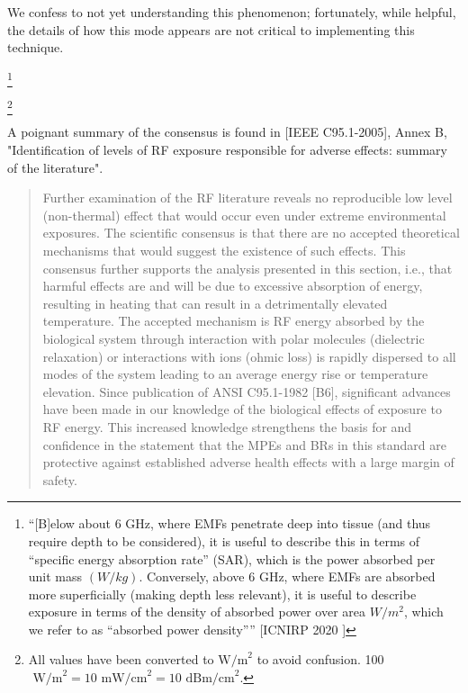\documentclass[fleqn,10pt]{article}
\begin{document}
\begin{multicols}{1}
{We confess to not yet understanding this phenomenon; fortunately, while helpful, the details of how this mode appears are not critical to implementing this technique.}

\footnote{``{[B]elow about 6 GHz, where EMFs penetrate deep into tissue (and thus require depth to be considered), it is useful to describe this in terms of “specific energy absorption rate” (SAR), which is the power absorbed per unit mass $(W/kg)$. Conversely, above 6 GHz, where EMFs are absorbed more superficially (making depth less relevant), it is useful to describe exposure in terms of the density of absorbed power over area $W/m^2$, which we refer to as “absorbed power density”}'' [ICNIRP 2020 \faExternalLink] }



\footnote{All values have been converted to $\text{W/m}^2$ to avoid confusion. 100 $\text{ W/m}^2 = 10 \text{ mW/cm}^2 = 10 \text{ dBm/cm}^2$.}



\end{multicols}
\clearpage



A poignant summary of the consensus is found in [IEEE C95.1-2005], Annex B, "Identification of levels of RF exposure responsible for adverse effects: summary of the literature".

\begin{quote}
Further examination of the RF literature reveals no reproducible low level (non-thermal) effect that would
occur even under extreme environmental exposures. The scientific consensus is that there are no accepted
theoretical mechanisms that would suggest the existence of such effects. This consensus further supports the
analysis presented in this section, i.e., that harmful effects are and will be due to excessive absorption of
energy, resulting in heating that can result in a detrimentally elevated temperature. The accepted mechanism
is RF energy absorbed by the biological system through interaction with polar molecules (dielectric relaxation) or interactions with ions (ohmic loss) is rapidly dispersed to all modes of the system leading to an
average energy rise or temperature elevation. Since publication of ANSI C95.1-1982 [B6], significant
advances have been made in our knowledge of the biological effects of exposure to RF energy. This
increased knowledge strengthens the basis for and confidence in the statement that the MPEs and BRs in this
standard are protective against established adverse health effects with a large margin of safety.

\end{quote}
\end{document}
